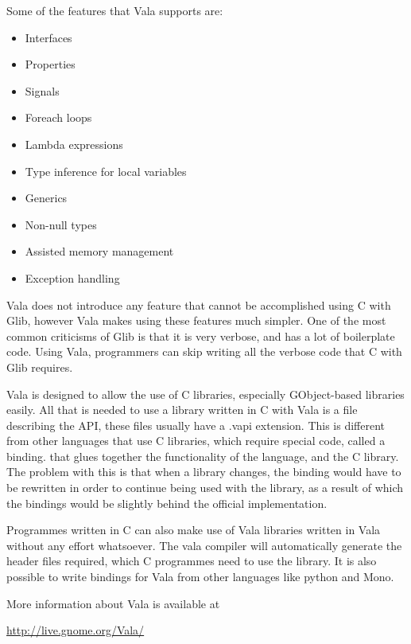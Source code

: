 Some of the features that Vala supports are:

\begin{itemize}
	\item Interfaces
	\item Properties
	\item Signals
	\item Foreach loops
	\item Lambda expressions
	\item Type inference for local variables
	\item Generics
	\item Non-null types
	\item Assisted memory management
	\item Exception handling
\end{itemize}

Vala does not introduce any feature that cannot be accomplished using C with Glib, however Vala makes using these features much simpler. One of the most common criticisms of Glib is that it is very verbose, and has a lot of boilerplate code. Using Vala, programmers can skip writing all the verbose  code that C with Glib requires.

Vala is designed to allow the use of C libraries, especially GObject-based libraries easily. All that is needed to use a library written in C with Vala is a file describing the API, these files usually have a .vapi extension. This is different from other languages that use C libraries, which require special code, called a binding. that glues together the functionality of the language, and the C library. The problem with this is that when a library changes, the binding would have to be rewritten in order to continue being used with the library, as a result of which the bindings would be slightly behind the official implementation.

Programmes written in C can also make use of Vala libraries written in Vala without any effort whatsoever. The vala compiler will automatically generate the header files required, which C programmes need to use the library. It is also possible to write bindings for Vala from other languages like python and Mono.

More information about Vala is available at

\hspace{0.25in}\url{http://live.gnome.org/Vala/}

